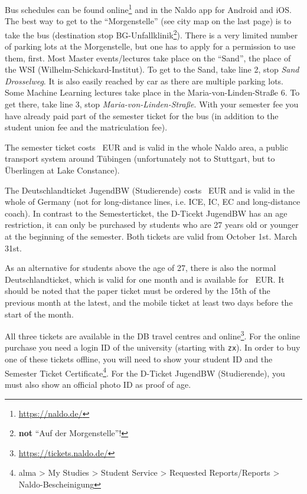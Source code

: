 \ifml
    Bus schedules can be found online\footnote{\url{https://naldo.de/}} and in the Naldo app for Android and iOS.\\
    The best way to get to the "`Morgenstelle"' (see city map on the last page) is to take the bus (destination stop BG-Unfallklinik\footnote{\textbf{not} "`Auf der Morgenstelle"'!}). There is a very limited number of parking lots at the Morgenstelle, but one has to apply for a permission to use them, first.
    Most Master events/lectures take place on the "`Sand"', the place of the WSI (Wilhelm-Schickard-Institut). To get to the Sand, take line 2, stop \emph{Sand Drosselweg}. It is also easily reached by car as there are multiple parking lots.
    Some Machine Learning lectures take place in the Maria-von-Linden-Straße 6. To get there, take line 3, stop \emph{Maria-von-Linden-Straße}.
    With your semester fee you have already paid part of the semester ticket for the bus (in addition to the student union fee and the matriculation fee).
    
    The semester ticket costs \semesterticketpreis~EUR and is valid in the whole Naldo area, a public transport system around
    Tübingen (unfortunately not to Stuttgart, but to Überlingen at Lake Constance).
    
    The Deutschlandticket JugendBW (Studierende) costs \jugendticketbwpreis~EUR and is valid in the whole of Germany (not for long-distance lines, i.e. ICE, IC, EC and long-distance coach).
    In contrast to the Semesterticket, the D-Ticekt JugendBW has an age restriction, it can only be purchased by students who are 27 years old or younger at the beginning of the semester.
    Both tickets are valid from
    \ifwintersemester
    October 1st.
    \fi
    \ifsommersemester
    March 31st.
    \fi

    As an alternative for students above the age of 27, there is also the normal Deutschlandticket, which is valid for one month and is available for \detickettuepreis~EUR. 
    It should be noted that the paper ticket must be ordered by the 15th of the previous month at the latest, and the mobile ticket at least two days before the start of the month.

    All three tickets are available in the DB travel centres and online\footnote{\url{https://tickets.naldo.de/}}. For the online purchase you need a login ID of the university (starting with \texttt{zx}).
    In order to buy one of these tickets offline, you will need to show your student ID and the Semester Ticket Certificate\footnote{alma > My Studies > Student Service > Requested Reports/Reports > Naldo-Bescheinigung}. For the D-Ticket JugendBW (Studierende), you must also show an official photo ID as proof of age.\\
    

